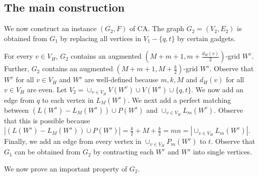 \documentclass[a4paper,12pt,makeidx]{article}
\newtheorem{lemma}{Lemma}
\begin{document}
\subsection{The main construction}
We now construct an instance $(G_2,F)$ of CA. The graph $G_2=(V_2,E_2)$ is obtained from $G_1$ by replacing all vertices in $V_1-\{q,t\}$ by certain gadgets.

For every $v \in V_H$, $G_2$ contains an augmented $(M+m+1,m+\frac{d_H(v)}{2})$-grid $W^v$. Further, $G_2$ contains an augmented $(M+m+1,M+\frac{k}{2})$-grid $W^s$. Observe that $W^v$ for all $v \in V_H$ and $W^s$ are well-defined because $m,k,M$ and $d_H(v)$ for all $v \in V_H$ are even. Let $V_2=\cup_{v \in V_H}V(W^v)\cup V(W^s)\cup\{q,t\}$. We now add an edge from $q$ to each vertex in $L_{M}(W^s)$. We next add a perfect matching between $(L(W^s)-L_{M}(W^s))\cup P(W^s)$ and $\cup_{v \in V_H}L_{m}(W^v)$. Observe that this is possible because $|(L(W^s)-L_{M}(W^s))\cup P(W^s)|=\frac{k}{2}+M+\frac{k}{2}=mn=|\cup_{v \in V_H}L_{m}(W^v)|$. Finally, we add an edge from every vertex in $\cup_{v \in V_H}P_{m}(W^v)$ to $t$. Observe that $G_1$ can be obtained from $G_2$ by contracting each $W^v$ and $W^s$ into single vertices.

We now prove an important property of $G_2$.


\end{document}
